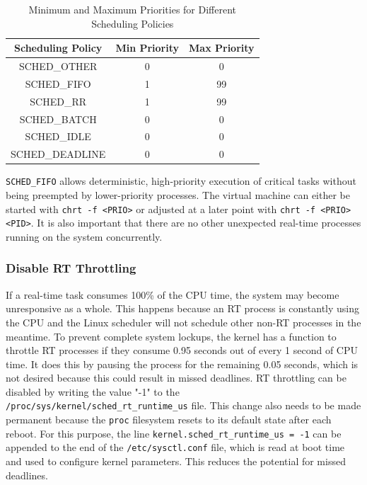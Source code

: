 \documentclass[MMR,Master,english]{style/twbook}
\begin{document}
\begin{table}[H]
	\centering
	\caption{Minimum and Maximum Priorities for Different Scheduling Policies}
	\label{tab:scheduling_priorities}
	\setlength{\tabcolsep}{0.5em} %
	{\renewcommand{\arraystretch}{1.2}%
		\begin{tabular}{|c|c|c|}
			\hline
			\textbf{Scheduling Policy} & \textbf{Min Priority} & \textbf{Max Priority} \\ \hline
			SCHED\_OTHER               & 0                     & 0                     \\ \hline
			SCHED\_FIFO                & 1                     & 99                    \\ \hline
			SCHED\_RR                  & 1                     & 99                    \\ \hline
			SCHED\_BATCH               & 0                     & 0                     \\ \hline
			SCHED\_IDLE                & 0                     & 0                     \\ \hline
			SCHED\_DEADLINE            & 0                     & 0                     \\ \hline
		\end{tabular}}
\end{table}

\noindent \texttt{SCHED\_FIFO} allows deterministic, high-priority execution of critical tasks without being preempted by lower-priority processes. The virtual machine can either be started with \texttt{chrt -f <PRIO>} or adjusted at a later point with \texttt{chrt -f <PRIO> <PID>}. It is also important that there are no other unexpected real-time processes running on the system concurrently.

\subsubsection{Disable RT Throttling}
If a real-time task consumes 100\% of the CPU time, the system may become unresponsive as a whole. This happens because an RT process is constantly using the CPU and the Linux scheduler will not schedule other non-RT processes in the meantime. To prevent complete system lockups, the kernel has a function to throttle RT processes if they consume 0.95 seconds out of every 1 second of CPU time. It does this by pausing the process for the remaining 0.05 seconds, which is not desired because this could result in missed deadlines. RT throttling can be disabled by writing the value "-1" to the \texttt{/proc/sys/kernel/sched\_rt\_runtime\_us} file. This change also needs to be made permanent because the \texttt{proc} filesystem resets to its default state after each reboot. For this purpose, the line \texttt{kernel.sched\_rt\_runtime\_us = -1} can be appended to the end of the \texttt{/etc/sysctl.conf} file, which is read at boot time and used to configure kernel parameters. This reduces the potential for missed deadlines.
\end{document}
